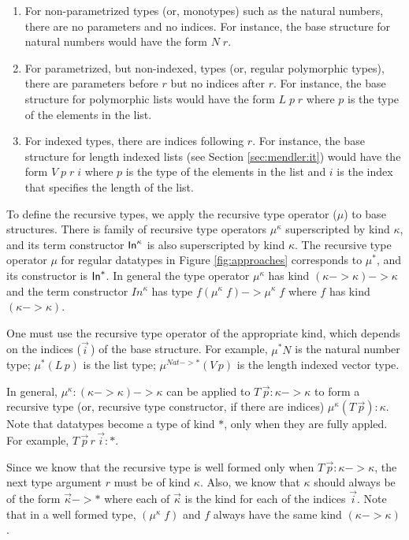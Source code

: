 \begin{enumerate}

\item For non-parametrized types (or, monotypes) such as the natural numbers,
there are no parameters and no indices. For instance, the base structure
for natural numbers would have the form $N\;r$. 

\item For parametrized,
but non-indexed, types (or, regular polymorphic types), there are parameters
before $r$ but no indices after $r$. For instance, the base structure for
polymorphic lists would have the form $L\;p\;r$ where $p$ is the type of
the elements in the list. 

\item For indexed types, there are indices following $r$.
For instance, the base structure for length indexed lists (see Section \ref{sec:mendler:it}) would have the
form $V\;p\;r\;i$ where $p$ is the type of the elements in the list and
$i$ is the index that specifies the length of the list.

\end{enumerate}

To define the recursive types, we apply the recursive type operator ($\mu$) to
base structures. There is  family of recursive type operators $\mu^\kappa$
superscripted by kind $\kappa$, and its term constructor $\textsf{In}^\kappa$ is also
superscripted by kind $\kappa$. The recursive type operator $\mu$
for regular datatypes in Figure \ref{fig:approaches} corresponds to $\mu^{*}$,
and its constructor is $\textsf{In}^{*}$. In general the type operator $\mu^\kappa$
has kind $(\kappa -> \kappa) -> \kappa$ and the term constructor
$In^\kappa$ has type $f (\mu^\kappa\; f) -> \mu^\kappa\; f$ where
$f$ has kind $(\kappa -> \kappa)$.

One must use the recursive type operator of the appropriate kind,
which depends on the indices ($\vec{i}\,$) of the base structure.
For example, $\mu^{*}N$ is the natural number type;
$\mu^{*}(L\,p)$ is the list type; $\mu^{\textit{Nat}-> *}(V\,p)$ is the length indexed vector type.

In general, $\mu^\kappa : (\kappa -> \kappa) -> \kappa$ can be
applied to $T\,\vec{p} : \kappa -> \kappa$ to form a recursive type
(or, recursive type constructor, if there are indices)
$\mu^\kappa(T\,\vec{p}) : \kappa$. Note that datatypes become a type of kind $*$, 
only when they are fully appled. For example,
$T\,\vec{p}\,r\,\vec{i} : *$. 

Since we know that the recursive type is
well formed only when $T\,\vec{p} : \kappa -> \kappa$,
the next type argument $r$ must be of kind $\kappa$.
Also, we know that $\kappa$ should always be of the form
$\vec{\kappa} -> *$ where each of $\vec{\kappa}$ is the kind for
each of the indices $\vec{i}$. Note that in a well formed
type, $(\mu^\kappa\; f)$ and $f$ always have the same
kind $(\kappa -> \kappa)$.

